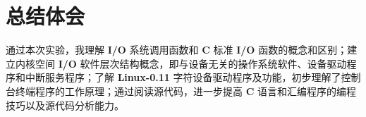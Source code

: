 \section{总结体会}
    \par 通过本次实验，我理解 \textbf{I/O} 系统调用函数和 \textbf{C} 标准 \textbf{I/O} 函数的概念和区别；建立内核空间 \textbf{I/O} 软件层次结构概念，即与设备无关的操作系统软件、设备驱动程序和中断服务程序；了解 \textbf{Linux-0.11} 字符设备驱动程序及功能，初步理解了控制台终端程序的工作原理；通过阅读源代码，进一步提高 \textbf{C} 语言和汇编程序的编程技巧以及源代码分析能力。
